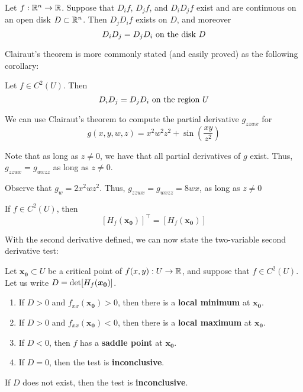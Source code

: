 \begin{theorem}
    
    Let $f: \mathbb{R}^n \to \mathbb{R}$.  Suppose that $D_if$, $D_jf$, and $D_iD_jf$ exist and are continuous on an open disk $D \subset \mathbb{R}^n$.  Then $D_jD_if$ exists on $D$, and moreover
    $$D_iD_j = D_jD_i\ \textnormal{on the disk} \ D$$
    
    \end{theorem}

    Clairaut's theorem is more commonly stated (and easily proved) as the following corollary:
    \begin{corollary}
       Let $f \in C^2(U)$.  Then  $$D_iD_j = D_jD_i\ \textnormal{on the region} \ U$$
    \end{corollary}

\begin{example}
    We can use Clairaut's theorem to compute the partial derivative $g_{zzwx}$ for $$g(x,y,w,z) = x^2w^2z^2 + \sin\left(\frac{xy}{z^2}\right)$$

    Note that as long as $z \neq 0$, we have that all partial derivatives of $g$ exist. Thus, $g_{zzwx} = g_{wxzz}$ as long as $z \neq 0$.  
    
    Observe that $g_w = 2x^2wz^2$.  Thus, $g_{zzwx} = g_{wxzz} = 8wx$, as long as $z\neq 0$
\end{example}

\begin{corollary}
    If $f \in C^2(U)$, then $$\left[H_f(\bm{x_0})\right]^\intercal = \left[H_f(\bm{x_0})\right]$$
\end{corollary}

With the second derivative defined, we can now state the two-variable second derivative test:

\begin{theorem}

Let $\bm{x_0} \subset U$ be a critical point of $f(x,y) : U \to \mathbb{R}$, and suppose that $f \in C^2(U)$.  Let us write $D = \textnormal{det}[H_f(\bm{x_0})]$.

\begin{enumerate}
    \item If $D > 0$ and $f_{xx}(\bm{x_0}) > 0$, then there is a \textbf{local minimum} at $\bm{x_0}$.
    \item If $D > 0$ and $f_{xx}(\bm{x_0}) < 0$, then there is a \textbf{local maximum} at $\bm{x_0}$. 
    \item If $D < 0$, then $f$ has a \textbf{saddle point} at $\bm{x_0}$. 
    \item If $D = 0$, then the test is \textbf{inconclusive}. 
\end{enumerate}

If $D$ does not exist, then the test is \textbf{inconclusive}.
\end{theorem}

